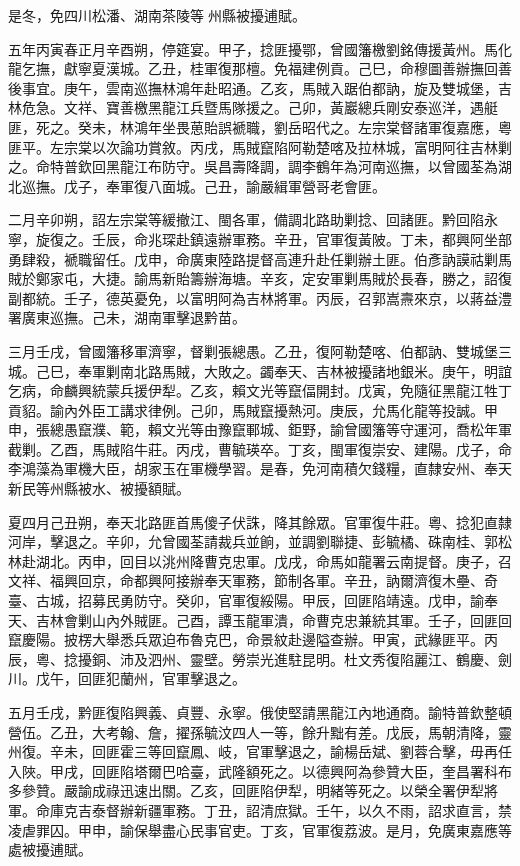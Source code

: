 \begin{pinyinscope}
是冬，免四川松潘、湖南茶陵等州縣被擾逋賦。

五年丙寅春正月辛酉朔，停筵宴。甲子，捻匪擾鄂，曾國籓檄劉銘傳援黃州。馬化龍乞撫，獻寧夏漢城。乙丑，桂軍復那檀。免福建例貢。己巳，命穆圖善辦撫回善後事宜。庚午，雲南巡撫林鴻年赴昭通。乙亥，馬賊入踞伯都訥，旋及雙城堡，吉林危急。文祥、寶善檄黑龍江兵暨馬隊援之。己卯，黃巖總兵剛安泰巡洋，遇艇匪，死之。癸未，林鴻年坐畏葸貽誤褫職，劉岳昭代之。左宗棠督諸軍復嘉應，粵匪平。左宗棠以次論功賞敘。丙戌，馬賊竄陷阿勒楚喀及拉林城，富明阿往吉林剿之。命特普欽回黑龍江布防守。吳昌壽降調，調李鶴年為河南巡撫，以曾國荃為湖北巡撫。戊子，奉軍復八面城。己丑，諭嚴緝軍營哥老會匪。

二月辛卯朔，詔左宗棠等緩撤江、閩各軍，備調北路助剿捻、回諸匪。黔回陷永寧，旋復之。壬辰，命兆琛赴鎮遠辦軍務。辛丑，官軍復黃陂。丁未，都興阿坐部勇肆殺，褫職留任。戊申，命廣東陸路提督高連升赴任剿辦土匪。伯彥訥謨祜剿馬賊於鄭家屯，大捷。諭馬新貽籌辦海塘。辛亥，定安軍剿馬賊於長春，勝之，詔復副都統。壬子，德英憂免，以富明阿為吉林將軍。丙辰，召郭嵩燾來京，以蔣益澧署廣東巡撫。己未，湖南軍擊退黔苗。

三月壬戌，曾國籓移軍濟寧，督剿張總愚。乙丑，復阿勒楚喀、伯都訥、雙城堡三城。己巳，奉軍剿南北路馬賊，大敗之。蠲奉天、吉林被擾諸地銀米。庚午，明誼乞病，命麟興統蒙兵援伊犁。乙亥，賴文光等竄偪開封。戊寅，免隨征黑龍江牲丁貢貂。諭內外臣工講求律例。己卯，馬賊竄擾熱河。庚辰，允馬化龍等投誠。甲申，張總愚竄濮、範，賴文光等由豫竄鄆城、鉅野，諭曾國籓等守運河，喬松年軍截剿。乙酉，馬賊陷牛莊。丙戌，曹毓瑛卒。丁亥，閩軍復崇安、建陽。戊子，命李鴻藻為軍機大臣，胡家玉在軍機學習。是春，免河南積欠錢糧，直隸安州、奉天新民等州縣被水、被擾額賦。

夏四月己丑朔，奉天北路匪首馬傻子伏誅，降其餘眾。官軍復牛莊。粵、捻犯直隸河岸，擊退之。辛卯，允曾國荃請裁兵並餉，並調劉聯捷、彭毓橘、硃南桂、郭松林赴湖北。丙申，回目以洮州降曹克忠軍。戊戌，命馬如龍署云南提督。庚子，召文祥、福興回京，命都興阿接辦奉天軍務，節制各軍。辛丑，訥爾濟復木壘、奇臺、古城，招募民勇防守。癸卯，官軍復綏陽。甲辰，回匪陷靖遠。戊申，諭奉天、吉林會剿山內外賊匪。己酉，譚玉龍軍潰，命曹克忠兼統其軍。壬子，回匪回竄慶陽。披楞大舉悉兵眾迫布魯克巴，命景紋赴邊隘查辦。甲寅，武緣匪平。丙辰，粵、捻擾銅、沛及泗州、靈壁。勞崇光進駐昆明。杜文秀復陷麗江、鶴慶、劍川。戊午，回匪犯蘭州，官軍擊退之。

五月壬戌，黔匪復陷興義、貞豐、永寧。俄使堅請黑龍江內地通商。諭特普欽整頓營伍。乙丑，大考翰、詹，擢孫毓汶四人一等，餘升黜有差。戊辰，馬朝清降，靈州復。辛未，回匪霍三等回竄鳳、岐，官軍擊退之，諭楊岳斌、劉蓉合擊，毋再任入陜。甲戌，回匪陷塔爾巴哈臺，武隆額死之。以德興阿為參贊大臣，奎昌署科布多參贊。嚴諭成祿迅速出關。乙亥，回匪陷伊犁，明緒等死之。以榮全署伊犁將軍。命庫克吉泰督辦新疆軍務。丁丑，詔清庶獄。壬午，以久不雨，詔求直言，禁凌虐罪囚。甲申，諭保舉盡心民事官吏。丁亥，官軍復荔波。是月，免廣東嘉應等處被擾逋賦。


\end{pinyinscope}
